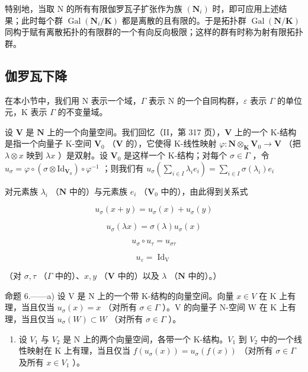 特别地，当取 N 的所有有限伽罗瓦子扩张作为族 \((\mathbf{N}_{i})\) 时，即可应用上述结果；此时每个群 \(\operatorname{Gal}(\mathbf{N}_{i}/\mathbf{K})\) 都是离散的且有限的。于是拓扑群 \(\operatorname{Gal}(\mathbf{N}/\mathbf{K})\) 同构于赋有离散拓扑的有限群的一个有向反向极限；这样的群有时称为射有限拓扑群。

\subsection{伽罗瓦下降}

在本小节中，我们用 N 表示一个域，\(\Gamma\) 表示 N 的一个自同构群，\(\varepsilon\) 表示 \(\Gamma\) 的单位元，K 表示 \(\Gamma\) 的不变量域。

设 \(\mathbf{V}\) 是 \(\mathbf{N}\) 上的一个向量空间。我们回忆（II，第 317 页），\(\mathbf{V}\) 上的一个 K-结构是指一个向量子 K-空间 \(\mathbf{V}_0\) （\(\mathbf{V}\) 的），它使得 K-线性映射 \(\varphi: \mathbf{N} \otimes_{\mathbf{K}} \mathbf{V}_0 \to \mathbf{V}\) （把 \(\lambda \otimes x\) 映到 \(\lambda x\) ）是双射。设 \(\mathbf{V}_0\) 是这样一个 K-结构；对每个 \(\sigma \in \Gamma\) ，令 \(u_\sigma = \varphi \circ (\sigma \otimes \mathrm{Id}_{\mathbf{V}_0}) \circ \varphi^{-1}\) ；则我们有 \(u_\sigma \left( \sum_{i \in I} \lambda_i e_i \right) = \sum_{i \in I} \sigma(\lambda_i) e_i\)

对元素族 \(\lambda_{i}\) （\(\mathbf{N}\) 中的）与元素族 \(e_i\) （\(\mathbf{V}_0\) 中的），由此得到关系式

\[
u _ {\sigma} (x + y) = u _ {\sigma} (x) + u _ {\sigma} (y)\tag{1}
\]

\[
u _ {\sigma} (\lambda x) = \sigma (\lambda) u _ {\sigma} (x)\tag{2}
\]

\[
u _ {\sigma} \circ u _ {\tau} = u _ {\sigma \tau}\tag{3}
\]

\[
u _ {\varepsilon} = \operatorname{Id} _ {\mathrm{V}}\tag{4}
\]

（对 \(\sigma, \tau\) （\(\Gamma\) 中的）、\(x, y\) （\(\mathbf{V}\) 中的）以及 \(\lambda\) （\(\mathbf{N}\) 中的）。）

命题 6.——a) 设 V 是 N 上的一个带 K-结构的向量空间。向量 \(x \in V\) 在 K 上有理，当且仅当 \(u_{\sigma}(x) = x\) （对所有 \(\sigma \in \Gamma\) ）。V 的向量子 N-空间 W 在 K 上有理，当且仅当 \(u_{\sigma}(W) \subset W\) （对所有 \(\sigma \in \Gamma\) ）。

\begin{enumerate}
\def\labelenumi{\alph{enumi})}
\setcounter{enumi}{1}
\tightlist
\item
  设 \(V_{1}\) 与 \(V_{2}\) 是 N 上的两个向量空间，各带一个 K-结构。\(V_{1}\) 到 \(V_{2}\) 中的一个线性映射在 K 上有理，当且仅当 \(f(u_{\sigma}(x)) = u_{\sigma}(f(x))\) （对所有 \(\sigma \in \Gamma\) 及所有 \(x \in V_{1}\) ）。
\end{enumerate}


